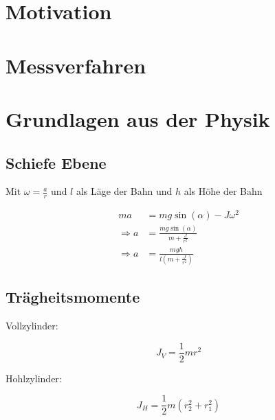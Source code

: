 \section{Motivation}



\section{Messverfahren}



\section{Grundlagen aus der Physik}

\subsection{Schiefe Ebene}

Mit $\omega = \frac{a}{r}$ und $l$ als Läge der Bahn und $h$ als Höhe der Bahn

\begin{align}
    ma & = mg\sin(\alpha)- J\omega^2 \\
    \Rightarrow a &=\frac{mg \sin(\alpha)}{m + \frac{J}{r^2}} \\
    \Rightarrow a  &=\frac{mg h}{l (m + \frac{J}{r^2})} \label{eq:a}
\end{align}

\subsection{Trägheitsmomente}

Vollzylinder:

\begin{equation}
    J_V = \frac{1}{2} mr^2
    \label{eq:JVoll}
\end{equation}

Hohlzylinder:

\begin{equation}
    J_H = \frac{1}{2}m (r_2^2 + r_1^2)
    \label{eq:JHohl}
\end{equation}

